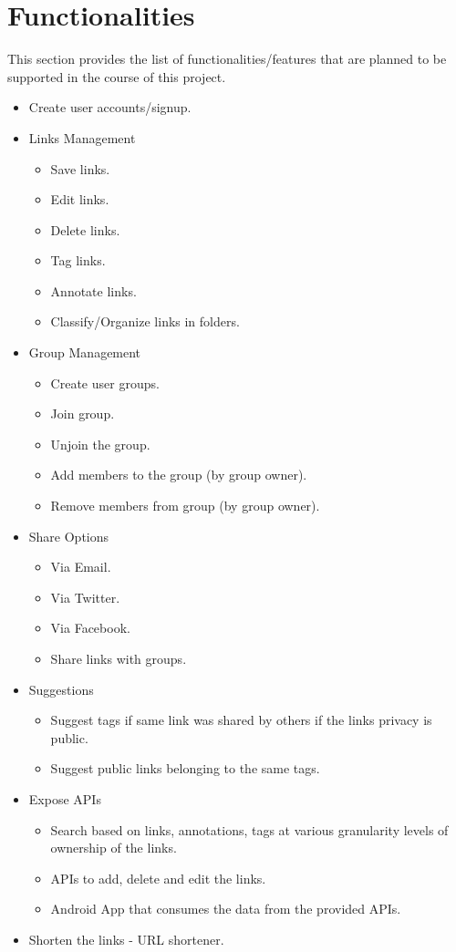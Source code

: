 \documentclass[11pt]{report} %
\begin{document}
\section*{Functionalities}
This section provides the list of functionalities/features that are planned to be supported in the course of this project.
\begin{itemize}
\item
	Create user accounts/signup.
\item
Links Management
\begin{itemize}
	\item
		Save links.
	\item
		Edit links.
	\item
		Delete links.
	\item
		Tag links.
	\item
		Annotate links.
	\item
		Classify/Organize links in folders.
\end{itemize}
\item
Group Management
\begin{itemize}
	\item
		Create user groups.
	\item
		Join group.
	\item
		Unjoin the group.
	\item
		Add members to the group (by group owner).
	\item
		Remove members from group (by group owner).
\end{itemize}
\item
Share Options
\begin{itemize}
	\item
		Via Email.
	\item
		Via Twitter.
	\item
		Via Facebook.
	\item
		Share links with groups.
\end{itemize}
\item
Suggestions
\begin{itemize}
	\item
		Suggest tags if same link was shared by others if the links privacy is public.
	\item
		Suggest public links belonging to the same tags.
\end{itemize}
\item
Expose APIs
\begin{itemize}
	\item
	Search based on links, annotations, tags at various granularity levels of ownership of the links.
	\item
	APIs to add, delete and edit the links.
	\item
	Android App that consumes the data from the provided APIs.
\end{itemize}
\item
Shorten the links - URL shortener.
\end{itemize}
\end{document}
